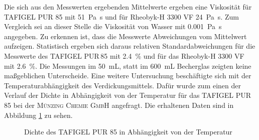 Die sich aus den Messwerten ergebenden Mittelwerte ergeben eine Viskosität für TAFIGEL PUR 85 mit \SI{51}{\pascal \second} und für Rheobyk-H 3300 VF \SI{24}{\pascal \second}. Zum Vergleich sei an dieser Stelle die Viskosität von Wasser mit \SI{0,001}{\pascal \second} angegeben. Zu erkennen ist, dass die Messwerte Abweichungen vom Mittelwert aufzeigen. Statistisch ergeben sich daraus relativen Standardabweichungen für die Messwerte des TAFIGEL PUR\,85 mit \SI{2,4}{\percent} und für das Rheobyk-H 3300 VF mit \SI{2,6}{\percent}. Die Messungen im \SI{50}{\milli \liter}, statt im \SI{600}{\milli \liter} Becherglas zeigten keine maßgeblichen Unterscheide.
Eine weitere Untersuchung beschäftigte sich mit der Temperaturabhängigkeit des Verdickungsmittels. Dafür wurde zum einen der Verlauf der Dichte in Abhängigkeit von der Temperatur für das TAFIGEL PUR 85 bei der \textsc{Münzing Chemie GmbH} angefragt. Die erhaltenen Daten sind in Abbildung \ref{dia:dichte} zu sehen.


\begin{figure}[h]
	\begin{center}
		\caption{Dichte des TAFIGEL PUR 85 in Abhängigkeit von der Temperatur}
		\label{dia:dichte}
	\end{center}
\end{figure} 

